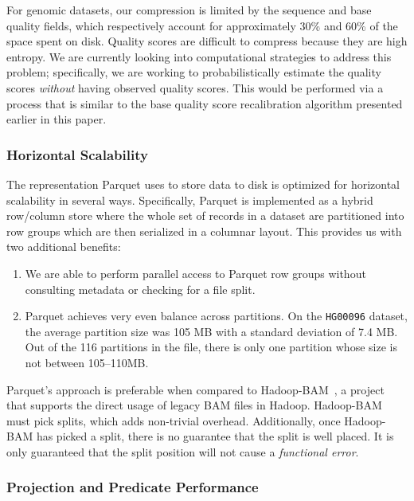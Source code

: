\documentclass{acm_proc_article-sp}
\begin{document}
For genomic datasets, our compression is limited by the sequence and base quality fields, which respectively
account for approximately 30\% and 60\% of the space spent on disk. Quality scores are difficult to compress
because they are high entropy. We are currently looking into computational strategies to address this problem;
specifically, we are working to probabilistically estimate the quality scores \emph{without} having observed quality
scores. This would be performed via a process that is similar to the base quality score recalibration algorithm
presented earlier in this paper.

\subsubsection{Horizontal Scalability}
\label{sec:horizontal-scalability}

The representation Parquet uses to store data to disk is optimized for horizontal scalability in several ways.
Specifically, Parquet is implemented as a hybrid row/column store where the whole set of records in a dataset
are partitioned into row groups which are then serialized in a columnar layout. This provides us with two additional
benefits:

\begin{enumerate}
\item We are able to perform parallel access to Parquet row groups without consulting metadata or checking for
a file split.
\item Parquet achieves very even balance across partitions. On the \texttt{HG00096} dataset, the average
partition size was 105 MB with a standard deviation of 7.4 MB. Out of the 116 partitions in the file, there is only
one partition whose size is not between 105--110MB.
\end{enumerate}

Parquet's approach is preferable when compared to Hadoop-BAM~\cite{niemenmaa12}, a project that supports
the direct usage of legacy BAM files in Hadoop. Hadoop-BAM must pick splits, which adds non-trivial overhead.
Additionally, once Hadoop-BAM has picked a split, there is no guarantee that the split is well placed. It is only
guaranteed that the split position will not cause a \emph{functional error}.

\subsubsection{Projection and Predicate Performance}
\label{sec:projection-predicate-performance}
\end{document}
